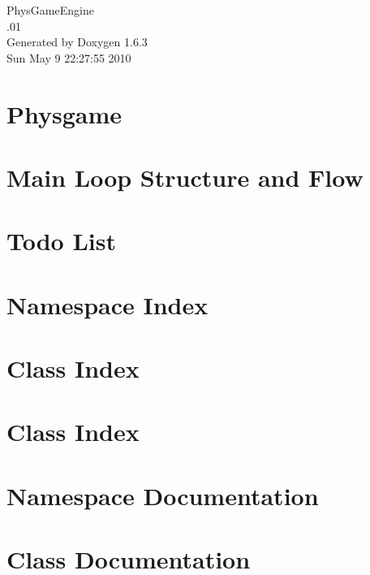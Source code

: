 \documentclass[a4paper]{book}
\begin{document}
\hypersetup{pageanchor=false}
\begin{titlepage}
\vspace*{7cm}
\begin{center}
{\Large PhysGameEngine \\[1ex]\large .01 }\\
\vspace*{1cm}
{\large Generated by Doxygen 1.6.3}\\
\vspace*{0.5cm}
{\small Sun May 9 22:27:55 2010}\\
\end{center}
\end{titlepage}
\clearemptydoublepage
{}
\tableofcontents
\clearemptydoublepage
{}
\hypersetup{pageanchor=true}
\chapter{Physgame}
\label{index}\hypertarget{index}{}
\chapter{Main Loop Structure and Flow}
\label{mainloop1}
\hypertarget{mainloop1}{}

\chapter{Todo List}
\label{todo}
\hypertarget{todo}{}

\chapter{Namespace Index}

\chapter{Class Index}

\chapter{Class Index}

\chapter{Namespace Documentation}

\chapter{Class Documentation}















\printindex
\end{document}
